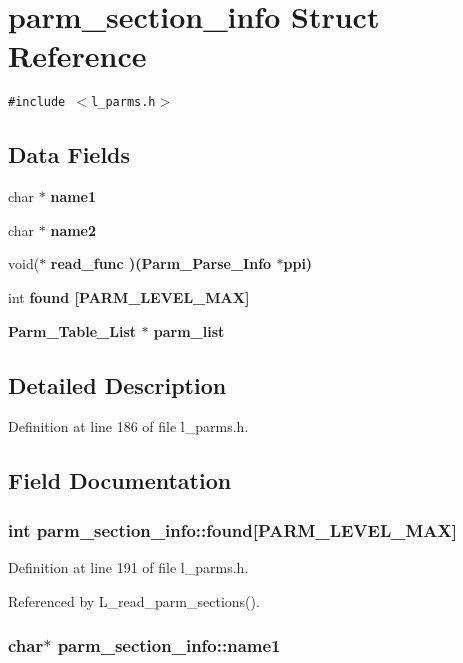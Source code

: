 \section{parm\_\-section\_\-info Struct Reference}
\label{structparm__section__info}
{\tt \#include $<$l\_\-parms.h$>$}

\subsection*{Data Fields}
\begin{CompactItemize}
\item 
char $\ast$ \bf{name1}
\item 
char $\ast$ \bf{name2}
\item 
void($\ast$ \bf{read\_\-func} )(\bf{Parm\_\-Parse\_\-Info} $\ast$ppi)
\item 
int \bf{found} [PARM\_\-LEVEL\_\-MAX]
\item 
\bf{Parm\_\-Table\_\-List} $\ast$ \bf{parm\_\-list}
\end{CompactItemize}


\subsection{Detailed Description}




Definition at line 186 of file l\_\-parms.h.

\subsection{Field Documentation}
\subsubsection{\setlength{\rightskip}{0pt plus 5cm}int \bf{parm\_\-section\_\-info::found}[PARM\_\-LEVEL\_\-MAX]}\label{structparm__section__info_f722597a763587b98074d254c4aecba4}




Definition at line 191 of file l\_\-parms.h.

Referenced by L\_\-read\_\-parm\_\-sections().
\subsubsection{\setlength{\rightskip}{0pt plus 5cm}char$\ast$ \bf{parm\_\-section\_\-info::name1}}\label{structparm__section__info_0ed3c04dbc4547f374256137350f810a}




